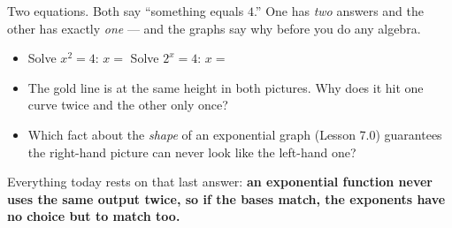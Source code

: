 \documentclass[10pt]{article}
\newcommand{\lgrid}[4]{%
  \draw[step=1, linegray!40, very thin] (#1,#3) grid (#2,#4);
  \draw[->, semithick, charcoal] (#1,0)--(#2,0) node[below right, font=\scriptsize]{$x$};
  \draw[->, semithick, charcoal] (0,#3)--(0,#4) node[left, font=\scriptsize]{$y$};}
\newcommand{\expgraph}[6]{\draw[very thick, forest, domain=#5:#6, samples=140, smooth]
  plot (\x,{(#1)*exp((#2)*((\x)-(#3)))+(#4)});}
\newcommand{\solline}[3]{\draw[goldacc, very thick] (#1,#3)--(#2,#3);}
\begin{document}
\begin{hookbox}
\begin{minipage}{\linewidth}
Two equations. Both say ``something equals $4$.'' One has \emph{two} answers and the other has exactly
\emph{one} --- and the graphs say why before you do any algebra.
\begin{center}
\end{center}
\end{minipage}
\vspace{4pt}
\begin{itemize}\setlength{\itemsep}{1pt}
  \item Solve $x^{2}=4$: \; $x=$  \qquad Solve $2^{x}=4$: \; $x=$ 
  \item The gold line is at the same height in both pictures. Why does it hit one curve twice and the other only once? 
  \item Which fact about the \emph{shape} of an exponential graph (Lesson 7.0) guarantees the right-hand picture can never look like the left-hand one? 
\end{itemize}
Everything today rests on that last answer: \textbf{an exponential function never uses the same output
twice, so if the bases match, the exponents have no choice but to match too.}
\end{hookbox}
\end{document}
